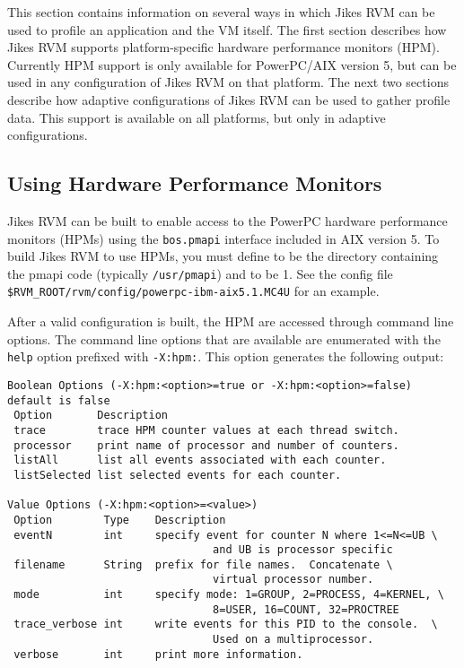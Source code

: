This section contains information on several ways in which
Jikes\TMweb{} RVM can be used to profile an application and the VM
itself.  The first section describes how Jikes RVM supports
platform-specific hardware performance monitors (HPM). Currently HPM
support is only available for
PowerPC\TMweb/AIX\TMweb{} version 5, but can be
used in any configuration of Jikes RVM on that platform.  The next two
sections describe how adaptive configurations of Jikes RVM can be used
to gather profile data.  This support is available on all platforms,
but only in adaptive configurations.

\subsection{Using Hardware Performance Monitors}

Jikes RVM can be built to enable access to the PowerPC hardware
performance monitors (HPMs) using the {\tt bos.pmapi} interface 
included in AIX version 5. To build Jikes RVM to use
HPMs, you must define  to be the directory containing
the pmapi code (typically {\tt /usr/pmapi}) and  to be 1.
See the config file {\tt \$RVM\_\-ROOT/rvm/config/powerpc-ibm-aix5.1.MC4U} for
an example.

After a valid configuration is built, the HPM are accessed through 
command line options. 
The command line options that are available are enumerated with the 
{\tt help} option prefixed with {\tt -X:hpm:}.  This option
generates the following output:
%
\begin{verbatim}
Boolean Options (-X:hpm:<option>=true or -X:hpm:<option>=false) default is false
 Option       Description
 trace        trace HPM counter values at each thread switch.
 processor    print name of processor and number of counters.
 listAll      list all events associated with each counter.
 listSelected list selected events for each counter.

Value Options (-X:hpm:<option>=<value>)
 Option        Type    Description
 eventN        int     specify event for counter N where 1<=N<=UB \
                                and UB is processor specific
 filename      String  prefix for file names.  Concatenate \
                                virtual processor number.
 mode          int     specify mode: 1=GROUP, 2=PROCESS, 4=KERNEL, \
                                8=USER, 16=COUNT, 32=PROCTREE
 trace_verbose int     write events for this PID to the console.  \
                                Used on a multiprocessor.
 verbose       int     print more information.
\end{verbatim}

